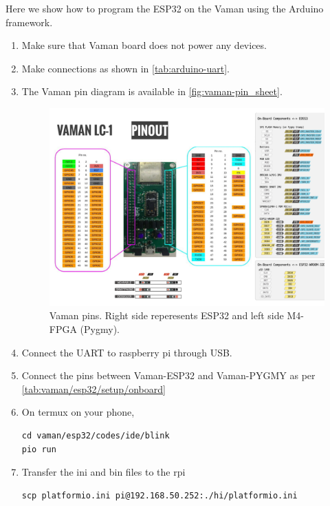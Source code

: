 Here we show how to program the ESP32 on the Vaman using the Arduino framework.
\begin{enumerate}[label=\arabic*.,ref=\theenumi]
\item Make sure that Vaman board does not power any devices.  
\item Make connections as shown in \autoref{tab:arduino-uart}.
\item The Vaman pin diagram is available in \autoref{fig:vaman-pin_sheet}.
\begin{figure}
\centering
\includegraphics[width=\columnwidth]{vaman/esp32/vaman-esp32/lcd/figs/pin_sheet.png}
	\caption{Vaman pins.  Right side reperesents ESP32 and left side M4-FPGA (Pygmy).}
\label{fig:vaman-pin_sheet}
\end{figure}
\begin{table}[!ht]
	\centering

\caption{}
\label{tab:arduino-uart}
\end{table}
%
\item Connect the UART to raspberry pi through USB.  
\item Connect the pins between Vaman-ESP32 and Vaman-PYGMY as per \autoref{tab:vaman/esp32/setup/onboard}
\begin{table}[h]
\centering

\caption{}
\label{tab:vaman/esp32/setup/onboard}
\end{table}
\item On termux on your phone, 
\begin{lstlisting}
cd vaman/esp32/codes/ide/blink
pio run
\end{lstlisting}
\item Transfer the ini and bin files to the rpi 
\begin{lstlisting}
scp platformio.ini pi@192.168.50.252:./hi/platformio.ini


\end{lstlisting}
\end{enumerate}
